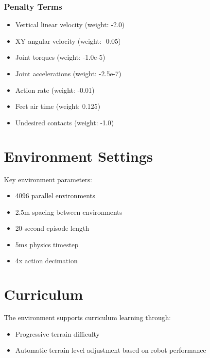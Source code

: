 \documentclass{article}
\begin{document}
\subsubsection{Penalty Terms}
\begin{itemize}
    \item Vertical linear velocity (weight: -2.0)
    \item XY angular velocity (weight: -0.05)
    \item Joint torques (weight: -1.0e-5)
    \item Joint accelerations (weight: -2.5e-7)
    \item Action rate (weight: -0.01)
    \item Feet air time (weight: 0.125)
    \item Undesired contacts (weight: -1.0)
\end{itemize}

\section{Environment Settings}
Key environment parameters:
\begin{itemize}
    \item 4096 parallel environments
    \item 2.5m spacing between environments
    \item 20-second episode length
    \item 5ms physics timestep
    \item 4x action decimation
\end{itemize}

\section{Curriculum}
The environment supports curriculum learning through:
\begin{itemize}
    \item Progressive terrain difficulty
    \item Automatic terrain level adjustment based on robot performance
\end{itemize}
\end{document}
